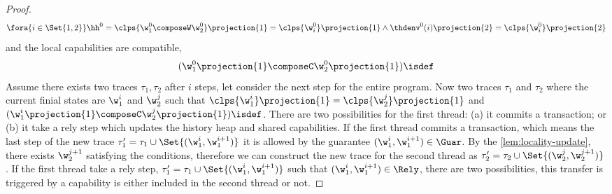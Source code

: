 \begin{proof}
\[ 
    \fora{i \in \Set{1,2}} 
    \hh^{0} = \clps{\w_{1}^{0} \composeW \w_{2}^{0}}\projection{1} = \clps{\w_{i}^{0}}\projection{1}
    \land \thdenv^{0}(i)\projection{2} = \clps{\w_{i}^{0}}\projection{2}
\]
and the local capabilities are compatible,
\[ 
    (\w_{1}^{0}\projection{1} \composeC \w_{2}^{0}\projection{1})\isdef 
\]
Assume there exists two traces \( \tau_{1}, \tau_{2}\) after \( i \) steps, let consider the next step for the entire program.
Now two traces \( \tau_{1}\) and \( \tau_{2} \) where the current finial states are \( \w_{1}^{i} \) and \( \w_{2}^{j} \) such that \( \clps{\w_{1}^{i}}\projection{1} = \clps{\w_{2}^{j}}\projection{1} \) and \( (\w_{1}^{i}\projection{1} \composeC \w_{2}^{j}\projection{1})\isdef \).
There are two possibilities for the first thread: (a) it commits a transaction; or (b) it take a rely step which updates the history heap and shared capabilities.
If the first thread commits a transaction, which means the last step of the new trace \( \tau_{1}' = \tau_{1} \cup \Set{(\w_{1}^{i}, \w_{1}^{i+1})} \) it is allowed by the guarantee \( (\w_{1}^{i}, \w_{1}^{i+1}) \in \Guar \).
By the \cref{lem:locality-update}, there exists \( \w_{2}^{j+1} \) satisfying the conditions, therefore we can construct the new trace for the second thread as \( \tau_{2}' = \tau_{2} \cup \Set{(\w_{2}^{j},\w_{2}^{j+1})} \).
If the first thread take a rely step, \ie \( \tau_{1}' = \tau_{1} \cup \Set{(\w_{1}^{i}, \w_{1}^{i+1})} \) such that \( (\w_{1}^{i}, \w_{1}^{i+1}) \in \Rely \), there are two possibilities, this transfer is triggered by a capability is either included in the second thread or not.


\end{proof}

